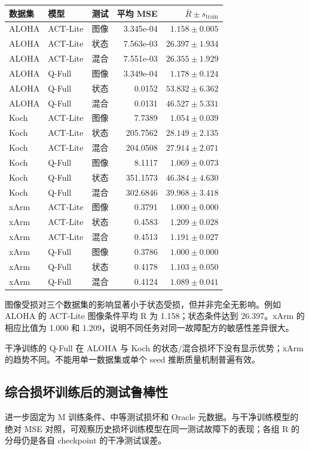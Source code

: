 \documentclass[11pt,a4paper,fontset=fandol]{ctexart}
\newcommand{\note}[1]{\begin{tcolorbox}[colback=panel,colframe=rule,boxrule=0.5pt,arc=1mm]#1\end{tcolorbox}}
\begin{document}
\begin{center}
\footnotesize
\begin{tabular}{lllrr}
\toprule
数据集 & 模型 & 测试 & 平均 MSE & $\bar R\pm s_{\mathrm{train}}$ \\
\midrule
ALOHA & ACT-Lite & 图像 & 3.345e-04 & $1.158\pm0.005$ \\
ALOHA & ACT-Lite & 状态 & 7.563e-03 & $26.397\pm1.934$ \\
ALOHA & ACT-Lite & 混合 & 7.551e-03 & $26.355\pm1.929$ \\
ALOHA & Q-Full & 图像 & 3.349e-04 & $1.178\pm0.124$ \\
ALOHA & Q-Full & 状态 & 0.0152 & $53.832\pm6.362$ \\
ALOHA & Q-Full & 混合 & 0.0131 & $46.527\pm5.331$ \\
Koch & ACT-Lite & 图像 & 7.7389 & $1.054\pm0.039$ \\
Koch & ACT-Lite & 状态 & 205.7562 & $28.149\pm2.135$ \\
Koch & ACT-Lite & 混合 & 204.0508 & $27.914\pm2.071$ \\
Koch & Q-Full & 图像 & 8.1117 & $1.069\pm0.073$ \\
Koch & Q-Full & 状态 & 351.1573 & $46.384\pm4.630$ \\
Koch & Q-Full & 混合 & 302.6846 & $39.968\pm3.418$ \\
xArm & ACT-Lite & 图像 & 0.3791 & $1.000\pm0.000$ \\
xArm & ACT-Lite & 状态 & 0.4583 & $1.209\pm0.028$ \\
xArm & ACT-Lite & 混合 & 0.4513 & $1.191\pm0.027$ \\
xArm & Q-Full & 图像 & 0.3786 & $1.000\pm0.000$ \\
xArm & Q-Full & 状态 & 0.4178 & $1.103\pm0.050$ \\
xArm & Q-Full & 混合 & 0.4124 & $1.089\pm0.041$ \\
\bottomrule
\end{tabular}
\end{center}
图像受损对三个数据集的影响显著小于状态受损，但并非完全无影响。例如 ALOHA 的 ACT-Lite 图像条件平均 R 为 1.158；状态条件达到 26.397。xArm 的相应比值为 1.000 和 1.209，说明不同任务对同一故障配方的敏感性差异很大。

\note{干净训练的 Q-Full 在 ALOHA 与 Koch 的状态/混合损坏下没有显示优势；xArm 的趋势不同。不能用单一数据集或单个 seed 推断质量机制普遍有效。}
\clearpage\subsection{综合损坏训练后的测试鲁棒性}
进一步固定为 M 训练条件、中等测试损坏和 Oracle 元数据。与干净训练模型的绝对 MSE 对照，可观察历史损坏训练模型在同一测试故障下的表现；各组 R 的分母仍是各自 checkpoint 的干净测试误差。
\end{document}
